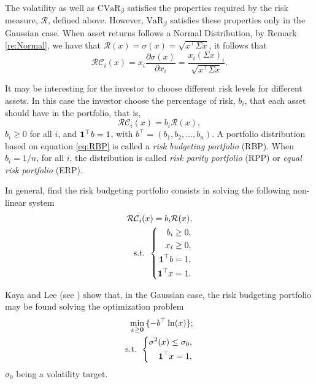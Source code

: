 The volatility as well as $\mbox{CVaR}_\beta$  satisfies the properties required by the risk measure, $\mathcal{R}$, defined above. However, $\mbox{VaR}_\beta$ satisfies these properties only in the Gaussian case. When asset returns follows a Normal Distribution, by Remark \ref{re:Normal}, we have that
$\mathcal{R}(x)=\sigma(x)=\sqrt{x^\top\Sigma x}$, it follows that
\[
	\mathcal{RC}_i(x)= x_i \frac{\partial \sigma(x)}{\partial x_i}=\frac{x_i (\Sigma x)_i}{\sqrt{x^\top\Sigma x }}.
\]

It may be interesting for the investor to choose different risk levels for different assets. In this case the investor choose the percentage of risk, $b_i$, that each asset should have in the portfolio, that is,
\begin{equation}\label{eq:RBP}
	\mathcal{RC}_i(x)=b_i\mathcal{R}(x),
\end{equation}
$b_i\geq 0$ for all $i$, and
${\bf 1}^\top b =1$, with $b^\top=(b_1, b_2, \dots, b_n)$. A portfolio distribution based on equation \eqref{eq:RBP} is called a \textit{risk budgeting portfolio} (RBP). When $b_i=1/n$, for all $i$, the distribution is called \textit{risk parity portfolio} (RPP) or \textit{equal risk portfolio} (ERP).

In general, find the risk budgeting portfolio consists in solving the following non-linear system
\begin{eqnarray*}
	\mathcal{RC}_i(x)=b_i\mathcal{R}(x), \\
	\mbox{s.t. }\left\{
	\begin{aligned}\nonumber
		b_i \geq 0,        \\
		x_i \geq 0,        \\
		{\bf 1}^\top b =1, \\
		{\bf 1}^\top x =1.
	\end{aligned}
	\right.
\end{eqnarray*}

Kaya and Lee (see \cite{KayaLee2012}) show that, in the Gaussian case, the risk budgeting portfolio may be found solving the optimization problem
\begin{eqnarray}
	\min_{x\geq \textbf{0}}\, \{-b^\top \ln(x)\}; \label{eq:RPP}\\
	\mbox{s.t. }\left\{ \nonumber
	\begin{aligned}\nonumber
		\sigma^2(x)\leq \sigma_0, \\
		{\bf 1}^\top x =1,
	\end{aligned}
	\right.
\end{eqnarray}
$\sigma_0$ being a volatility target.


